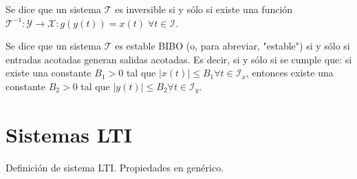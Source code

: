 \begin{definition}[Invertibilidad]
    Se dice que un sistema $\mathcal{T}$ es inversible si y sólo si existe una función $\mathcal{T}^{-1}: \mathcal{Y} \rightarrow \mathcal{X} : g(y(t)) = x(t) \; \forall t \in \mathcal{I}$.
\end{definition}

\begin{definition}
    Se dice que un sistema $\mathcal{T}$ es estable BIBO (o, para abreviar, "estable") si y sólo si entradas acotadas generan salidas acotadas. Es decir, si y sólo si se cumple que: si existe una constante $B_1 > 0$ tal que $|x(t)| \leq B_1 \forall t \in \mathcal{I}_x$, entonces existe una constante $B_2 > 0$ tal que $|y(t)| \leq B_2 \forall t \in \mathcal{I}_y$.
\end{definition}

\section{Sistemas LTI}

Definición de sistema LTI. Propiedades en genérico. 